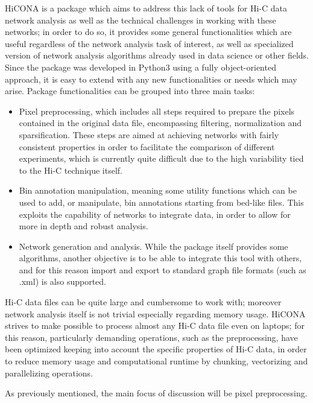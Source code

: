 HiCONA is a package which aims to address this lack of tools for Hi-C data network analysis as well as the technical challenges in working with these networks; in order to do so, it provides some general functionalities which are useful regardless of the network analysis task of interest, as well as specialized version of network analysis algorithms already used in data science or other fields. Since the package was developed in Python3 using a fully object-oriented approach, it is easy to extend with any new functionalities or needs which may arise. Package functionalities can be grouped into three main tasks:
\begin{itemize}\tightlist
  \item Pixel preprocessing, which includes all steps required to prepare the pixels contained in the original data file, encompassing filtering, normalization and sparsification. These steps are aimed at achieving networks with fairly consistent properties in order to facilitate the comparison of different experiments, which is currently quite difficult due to the high variability tied to the Hi-C technique itself.
  \item Bin annotation manipulation, meaning some utility functions which can be used to add, or manipulate, bin annotations starting from bed-like files. This exploits the capability of networks to integrate data, in order to allow for more in depth and robust analysis. 
  \item Network generation and analysis. While the package itself provides some algorithms, another objective is to be able to integrate this tool with others, and for this reason import and export to standard graph file formats (such as .xml) is also supported.  
\end{itemize}

Hi-C data files can be quite large and cumbersome to work with; moreover network analysis itself is not trivial especially regarding memory usage. HiCONA strives to make possible to process almost any Hi-C data file even on laptops; for this reason, particularly demanding operations, such as the preprocessing, have been optimized keeping into account the specific properties of Hi-C data, in order to reduce memory usage and computational runtime by chunking, vectorizing and parallelizing operations.

As previously mentioned, the main focus of discussion will be pixel preprocessing.

